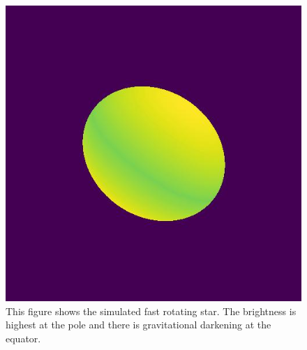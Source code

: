 \begin{figure}
	\centering
	\includegraphics[width=0.8\linewidth]{fig/ellipse/ellipse6018.jpg}
	\caption{This figure shows the simulated fast rotating star. The brightness is highest at the pole and there is gravitational darkening at the equator.}
	\label{fig:image}
\end{figure}
